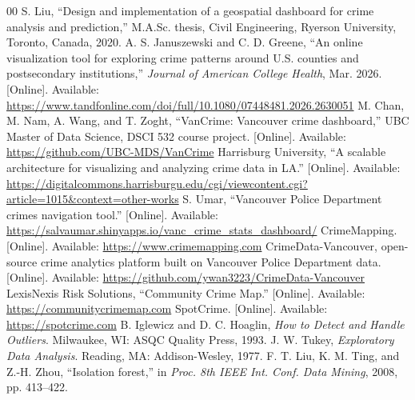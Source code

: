 \documentclass[conference]{IEEEtran}
\begin{document}
\begin{thebibliography}{00}
 S. Liu, ``Design and implementation of a geospatial dashboard for crime analysis and prediction,'' M.A.Sc. thesis, Civil Engineering, Ryerson University, Toronto, Canada, 2020.
 A. S. Januszewski and C. D. Greene, ``An online visualization tool for exploring crime patterns around U.S. counties and postsecondary institutions,'' \textit{Journal of American College Health}, Mar. 2026. [Online]. Available: \url{https://www.tandfonline.com/doi/full/10.1080/07448481.2026.2630051}
 M. Chan, M. Nam, A. Wang, and T. Zoght, ``VanCrime: Vancouver crime dashboard,'' UBC Master of Data Science, DSCI 532 course project. [Online]. Available: \url{https://github.com/UBC-MDS/VanCrime}
 Harrisburg University, ``A scalable architecture for visualizing and analyzing crime data in LA.'' [Online]. Available: \url{https://digitalcommons.harrisburgu.edu/cgi/viewcontent.cgi?article=1015&context=other-works}
 S. Umar, ``Vancouver Police Department crimes navigation tool.'' [Online]. Available: \url{https://salvaumar.shinyapps.io/vanc_crime_stats_dashboard/}
 CrimeMapping. [Online]. Available: \url{https://www.crimemapping.com}
 CrimeData-Vancouver, open-source crime analytics platform built on Vancouver Police Department data. [Online]. Available: \url{https://github.com/ywan3223/CrimeData-Vancouver}
 LexisNexis Risk Solutions, ``Community Crime Map.'' [Online]. Available: \url{https://communitycrimemap.com}
 SpotCrime. [Online]. Available: \url{https://spotcrime.com}
 B. Iglewicz and D. C. Hoaglin, \textit{How to Detect and Handle Outliers}. Milwaukee, WI: ASQC Quality Press, 1993.
 J. W. Tukey, \textit{Exploratory Data Analysis}. Reading, MA: Addison-Wesley, 1977.
 F. T. Liu, K. M. Ting, and Z.-H. Zhou, ``Isolation forest,'' in \textit{Proc. 8th IEEE Int. Conf. Data Mining}, 2008, pp. 413--422.
\end{thebibliography}
\end{document}
